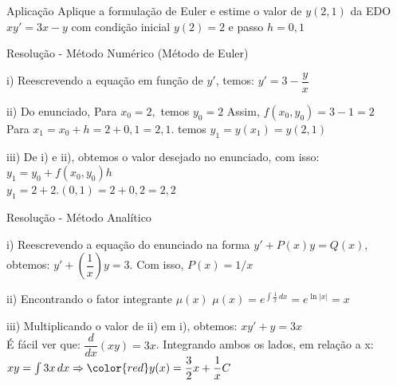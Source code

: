 \documentclass[aspectratio=169,10pt]{beamer}
\begin{document}
	\begin{frame}{Aplicação}
		\justifying
		Aplique a formulação de Euler e estime o valor de $y(2,1)$ da EDO $xy'=3x-y$ com condição inicial $y(2)=2$ e passo $h=0,1$
	\end{frame}

	\begin{frame}{Resolução - Método Numérico (Método de Euler)}
		\begin{block}{i) Reescrevendo a equação em função de $y'$, temos:}
			$y' = 3-\dfrac{y}{x}$
		\end{block}
		
		\begin{block}{ii) Do enunciado,}
			Para $x_{0}=2,$ temos $y_{0}=2$ Assim, $f(x_{0},y_{0})=3-1=2$ \\
			Para $x_{1}=x_{0}+h=2+0,1=2,1.$ temos $y_{1}=y(x_{1})=y(2,1)$ \\
		\end{block}
		
		\begin{block}{iii) De i) e ii), obtemos o valor desejado no enunciado, com isso:}
			$y_{1}=y_{0}+f(x_{0},y_{0})h$ \\
			$y_{1}=2+2.(0,1)=2+0,2=2,2$
		\end{block}
	\end{frame}
	
	\begin{frame}{Resolução - Método Analítico}
		\begin{block}{i) Reescrevendo a equação do enunciado na forma $y'+P(x)y=Q(x)$, obtemos:}
			$y'+\left(  \dfrac{1}{x} \right)y=3$. Com isso, $P(x)={1}/{x}$
		\end{block}
		
		\begin{block}{ii) Encontrando o fator integrante $\mu (x)$}
			$\mu (x) = e ^ {\int \frac{1}{x} \, dx}=e ^{\ln |x|} = x$
		\end{block}
		
		\begin{block}{iii) Multiplicando o valor de ii) em i), obtemos:}
			$xy'+y=3x$ \\
			É fácil ver que: $\dfrac{d}{dx}(xy)=3x$. Integrando ambos os lados, em relação a x: \\
			\vspace{2mm}
			$xy=\int 3x \,dx \Rightarrow  \color{red}y(x)=\dfrac{3}{2}x+\dfrac{1}{x}C$
			
		\end{block}
	\end{frame}
	
\end{document}
